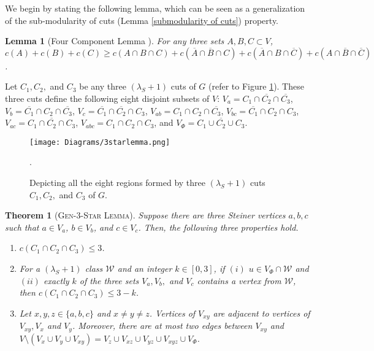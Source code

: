 \documentclass[letterpaper,11pt]{article}
\newtheorem{theorem}{Theorem}[]
\newtheorem{lemma}{Lemma}[]
\begin{document}
We begin by stating the following lemma, which can be seen as a generalization of the sub-modularity of cuts (Lemma \ref{submodularity of cuts}) property.
\begin{lemma} [Four Component Lemma \cite{DBLP:conf/focs/Benczur95}] \label{lem : four component lemma}
    For any three sets $A,B,C\subset V$, $c(A)+c(B)+c(C)\ge c(A\cap B\cap C)+c(\overline{A}\cap \overline{B}\cap C)+c(\overline{A}\cap B \cap \overline{C})+c(A\cap \overline{B}\cap \overline{C})$.
\end{lemma}
Let $C_1, C_2,$ and $C_3$ be any three $(\lambda_S+1)$ cuts of $G$ (refer to Figure \ref{fig : regions of three cuts}). These three cuts define the following eight disjoint subsets of $V$: $V_a=C_1\cap \overline{C_2}\cap \overline{C_3}$, $V_b=\overline{C_1}\cap C_2 \cap \overline{C_3}$, $V_c=\overline{C_1}\cap \overline{C_2}\cap C_3$, $V_{ab}=C_1\cap C_2\cap \overline{C_3}$, $V_{bc}=\overline{C_1}\cap C_2\cap C_3$, $V_{ac}=C_1\cap \overline{C_2}\cap C_3$, $V_{abc}=C_1\cap C_2\cap C_3$, and $V_{\Phi}=\overline{C_1\cup C_2\cup C_3}$.    
  \begin{figure}
 \centering
    \texttt{[image: Diagrams/3starlemma.png]} 
   \caption{Depicting all the eight regions formed by three $(\lambda_S+1)$ cuts $C_1,C_2,$ and $C_3$ of $G$.}
  \label{fig : regions of three cuts}. 
\end{figure}
\begin{theorem}[\textsc{Gen-3-Star Lemma}] \label{thm : gen 3 star} Suppose there are three Steiner vertices $a,b,c$ such that $a\in V_a$, $b\in V_b$, and $c\in V_c$.
Then, the following three properties hold.
    \begin{enumerate}
        \item $c(C_1\cap C_2 \cap C_3)\le 3$.
        \item For a $(\lambda_S+1)$ class ${\mathcal W}$ and an integer $k\in [0,3]$, if $(i)$ $u\in V_{\Phi}\cap {\mathcal W}$ and $(ii)$ exactly $k$ of the three sets $V_a,V_b,$ and $V_c$ contains a vertex from ${\mathcal W}$, then $c(C_1\cap C_2\cap C_3)\le 3-k$. 
        \item Let $x,y,z\in \{a,b,c\}$ and $x\ne y\ne z$. 
        Vertices of $V_{xy}$ are adjacent to vertices of $V_{xy}, V_x$ and $V_y$. Moreover, there are at most two edges between $V_{xy}$ and $V\setminus (V_x\cup V_y\cup V_{xy})=V_z\cup V_{xz} \cup V_{yz}\cup V_{xyz}\cup V_{\Phi}$. 
    \end{enumerate}
\end{theorem}
\end{document}

